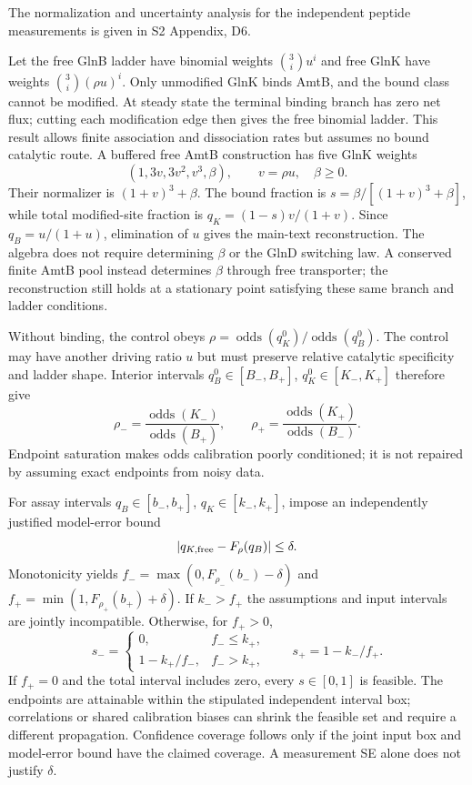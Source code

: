 \documentclass[11pt]{article}
\begin{document}
The normalization and uncertainty analysis for the independent peptide measurements is given in S2 Appendix, D6.


Let the free GlnB ladder have binomial weights $\binom3i u^i$ and free GlnK have weights $\binom3i(\rho u)^i$. Only unmodified GlnK binds AmtB, and the bound class cannot be modified. At steady state the terminal binding branch has zero net flux; cutting each modification edge then gives the free binomial ladder. This result allows finite association and dissociation rates but assumes no bound catalytic route. A buffered free AmtB construction has five GlnK weights
\[
 (1,3v,3v^2,v^3,\beta),\qquad v=\rho u,\quad\beta\geq0.
\]
Their normalizer is $(1+v)^3+\beta$. The bound fraction is $s=\beta/[(1+v)^3+\beta]$, while total modified-site fraction is $q_K=(1-s)v/(1+v)$. Since $q_B=u/(1+u)$, elimination of $u$ gives the main-text reconstruction. The algebra does not require determining $\beta$ or the GlnD switching law. A conserved finite AmtB pool instead determines $\beta$ through free transporter; the reconstruction still holds at a stationary point satisfying these same branch and ladder conditions.

Without binding, the control obeys $\rho=\operatorname{odds}(q_K^0)/\operatorname{odds}(q_B^0)$. The control may have another driving ratio $u$ but must preserve relative catalytic specificity and ladder shape. Interior intervals $q_B^0\in[B_-,B_+]$, $q_K^0\in[K_-,K_+]$ therefore give
\[
 \rho_- =\frac{\operatorname{odds}(K_-)}{\operatorname{odds}(B_+)},\qquad
 \rho_+ =\frac{\operatorname{odds}(K_+)}{\operatorname{odds}(B_-)}.
\]
Endpoint saturation makes odds calibration poorly conditioned; it is not repaired by assuming exact endpoints from noisy data.

For assay intervals $q_B\in[b_-,b_+]$, $q_K\in[k_-,k_+]$, impose an independently justified model-error bound
\[
 |q_{K,\rm free}-F_\rho(q_B)|\leq\delta.
\]
Monotonicity yields $f_- =\max(0,F_{\rho_-}(b_-)-\delta)$ and $f_+=\min(1,F_{\rho_+}(b_+)+\delta)$. If $k_->f_+$ the assumptions and input intervals are jointly incompatible. Otherwise, for $f_+>0$,
\[
 s_-=\begin{cases}0,&f_-\leq k_+,\\1-k_+/f_-,&f_->k_+,\end{cases}
 \qquad s_+=1-k_-/f_+.
\]
If $f_+=0$ and the total interval includes zero, every $s\in[0,1]$ is feasible. The endpoints are attainable within the stipulated independent interval box; correlations or shared calibration biases can shrink the feasible set and require a different propagation. Confidence coverage follows only if the joint input box and model-error bound have the claimed coverage. A measurement SE alone does not justify $\delta$.
\end{document}
